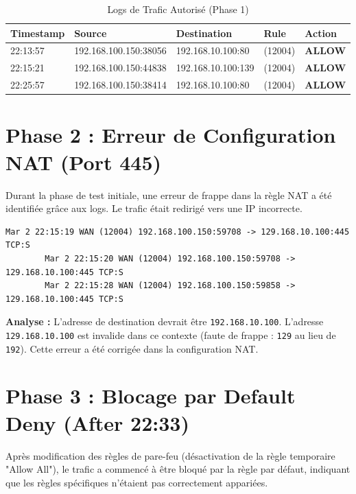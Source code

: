 \documentclass[12pt,a4paper,openany]{report}
\newcommand{\tableheadcolor}{\rowcolor{tableheadbg}}
\begin{document}
	\begin{table}[ht]
		\centering
		\small
		\renewcommand{\arraystretch}{1.4}
		\setlength{\arrayrulewidth}{0.5pt}
		\begin{tabular}{p{2.4cm} p{4.2cm} p{3.6cm} >{\centering\arraybackslash}p{1.8cm} >{\centering\arraybackslash}p{1.8cm}}
			\arrayrulecolor{tableborder}
			\hline
			\tableheadcolor
			\textcolor{tableheadfg}{\textbf{Timestamp}} &
			\textcolor{tableheadfg}{\textbf{Source}} &
			\textcolor{tableheadfg}{\textbf{Destination}} &
			\textcolor{tableheadfg}{\textbf{Rule}} &
			\textcolor{tableheadfg}{\textbf{Action}} \\
			\hline
			\rowcolor{tablerowalt}
			22:13:57 & 192.168.100.150:38056 & 192.168.10.100:80  & (12004) & \textcolor{green!50!black}{\textbf{ALLOW}} \\
			22:15:21 & 192.168.100.150:44838 & 192.168.10.100:139 & (12004) & \textcolor{green!50!black}{\textbf{ALLOW}} \\
			\rowcolor{tablerowalt}
			22:25:57 & 192.168.100.150:38414 & 192.168.10.100:80  & (12004) & \textcolor{green!50!black}{\textbf{ALLOW}} \\
			\hline
		\end{tabular}
		\caption{Logs de Trafic Autorisé (Phase 1)}
		\label{tab:logs-allow}
	\end{table}
	
	\section{Phase 2 : Erreur de Configuration NAT (Port 445)}
	Durant la phase de test initiale, une erreur de frappe dans la règle NAT a été identifiée grâce aux logs. Le trafic était redirigé vers une IP incorrecte.
	
	\begin{lstlisting}[style=logstyle,caption=Preuve de l'erreur NAT dans les logs]
		Mar 2 22:15:19 WAN (12004) 192.168.100.150:59708 -> 129.168.10.100:445 TCP:S
		Mar 2 22:15:20 WAN (12004) 192.168.100.150:59708 -> 129.168.10.100:445 TCP:S
		Mar 2 22:15:28 WAN (12004) 192.168.100.150:59858 -> 129.168.10.100:445 TCP:S
	\end{lstlisting}
	\textbf{Analyse :} L'adresse de destination devrait être \texttt{192.168.10.100}. L'adresse \texttt{129.168.10.100} est invalide dans ce contexte (faute de frappe : \texttt{129} au lieu de \texttt{192}). Cette erreur a été corrigée dans la configuration NAT.
	
	\section{Phase 3 : Blocage par Default Deny (After 22:33)}
	Après modification des règles de pare-feu (désactivation de la règle temporaire "Allow All"), le trafic a commencé à être bloqué par la règle par défaut, indiquant que les règles spécifiques n'étaient pas correctement appariées.
	
\end{document}
